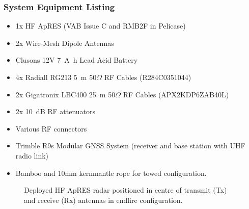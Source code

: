 \documentclass[a4paper,12pt]{article}
\begin{document}
\subsubsection{System Equipment Listing}
\begin{itemize}
  \item 1x HF ApRES (VAB Issue C and RMB2F in Pelicase)
  \item 2x Wire-Mesh Dipole Antennas
  \item Clusons 12V \SI{7}{\ampere\hour} Lead Acid Battery
  \item 4x Radiall RG213 \SI{5}{\metre} 50$\Omega$ RF Cables (R284C0351044)
  \item 2x Gigatronix LBC400 \SI{25}{\metre} 50$\Omega$ RF Cables (APX2KDP6ZAB40L)
  \item 2x \SI{10}{\deci\bel} RF attenuators
  \item Various RF connectors
  \item Trimble R9s Modular GNSS System (receiver and base station with UHF
  radio link)
  \item Bamboo and 10mm kernmantle rope for towed configuration.
\end{itemize}

\begin{figure}[htbp]
  \centering
  


  \caption{
    Deployed HF ApRES radar positioned in centre of transmit (Tx) and receive
    (Rx) antennas in endfire configuration.
  }
  \label{FigHFApRESNeumayer}
\end{figure}
\end{document}
